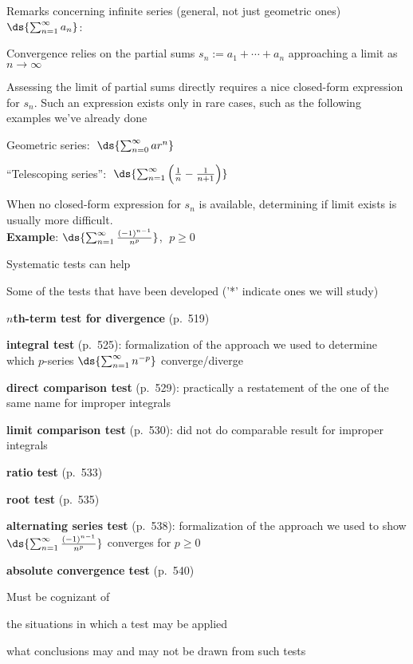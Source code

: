 \documentclass[12pt,fleqn]{article}
\begin{document}
\np
\ni
Remarks concerning infinite series (general, not just geometric ones)
$\ds{\sum_{n=1}^\infty a_n}$:
\be
\item
  Convergence relies on the partial sums $s_n := a_1 + \cdots + a_n$
  approaching a limit as $n\rightarrow\infty$
\item
  Assessing the limit of partial sums directly requires a nice
  closed-form expression for $s_n$.  Such an expression exists only
  in rare cases, such as the following examples we've already done
  \bi
  \item[] Geometric series: $\;\ds{\sum_{n=0}^\infty ar^n}$
  \item[]
	``Telescoping series'': $\;\ds{\sum_{n=1}^\infty \left(\frac{1}{n}
	- \frac{1}{n+1}\right)}$
  \ei
\item
  When no closed-form expression for $s_n$ is available, determining
  if limit exists is usually more difficult. \\[8pt]
  {\bf Example}: $\ds{\sum_{n=1}^\infty \frac{(-1)^{n-1}}{n^p}}$,
  $\; p \ge 0$
\item
  Systematic tests can help
  \bi
  \item Some of the tests that have been developed ('*'
	indicate ones we will study)
	\bi
	\item *{\bf $n$th-term test for divergence} (p.~519)
	\item
	  {\bf integral test} (p.~525): formalization of the approach
	  we used to determine which $p$-series $\ds{\sum_{n=1}^\infty n^{-p}}$
	  converge/diverge
	\item
	  {\bf direct comparison test} (p.~529): practically a restatement
	  of the one of the same name for improper integrals
	\item
	  {\bf limit comparison test} (p.~530): did not do comparable
	  result for improper integrals
	\item *{\bf ratio test} (p.~533)
	\item {\bf root test} (p.~535)
	\item
	  {\bf alternating series test} (p.~538): formalization of
	  the approach we used to show
	  $\ds{\sum_{n=1}^\infty \frac{(-1)^{n-1}}{n^p}}$ converges
	  for $p \ge 0$
	\item *{\bf absolute convergence test} (p.~540)
	\ei
  \item Must be cognizant of
	\bi
	\item
	  the situations in which a test may be applied
	\item
	  what conclusions may and may not be drawn from such tests
	\ei
  \ei
\ee
\end{document}
